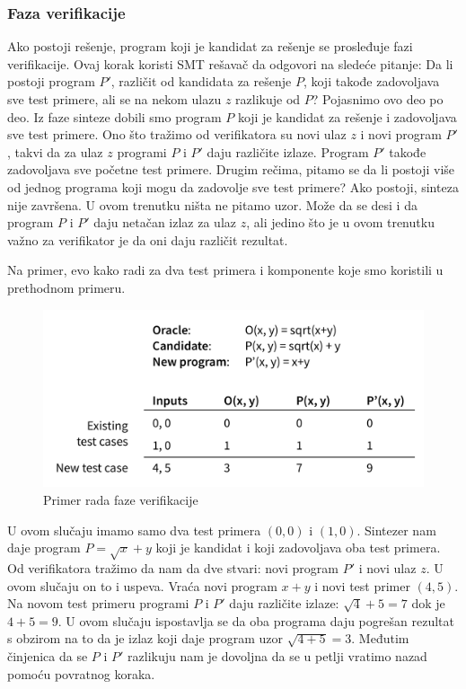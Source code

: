 \subsubsection*{Faza verifikacije}

Ako postoji rešenje, program koji je kandidat za rešenje se prosleđuje fazi verifikacije. Ovaj korak koristi SMT rešavač da odgovori na sledeće pitanje: Da li postoji program $P'$, različit od kandidata za rešenje $P$, koji takođe zadovoljava sve test primere, ali se na nekom ulazu $z$ razlikuje od $P$?
Pojasnimo ovo deo po deo. Iz faze sinteze dobili smo program $P$ koji je kandidat za rešenje i zadovoljava sve test primere. Ono što tražimo od verifikatora su novi ulaz $z$ i novi program $P'$, takvi da za ulaz $z$ programi $P$ i $P'$ daju različite izlaze. Program $P'$ takođe zadovoljava sve početne test primere.
Drugim rečima, pitamo se da li postoji više od jednog programa koji mogu da zadovolje sve test primere? Ako postoji, sinteza nije završena.
U ovom trenutku ništa ne pitamo uzor. Može da se desi i da program $P$ i $P'$ daju netačan izlaz za ulaz $z$, ali jedino što je u ovom trenutku važno za verifikator je da oni daju različit rezultat.

Na primer, evo kako radi za dva test primera i komponente koje smo koristili u prethodnom primeru.

\begin{figure}[h!]
    \begin{center}
        \includegraphics[scale=0.6]{resources/oracle-table.png}
    \end{center}
    \caption{Primer rada faze verifikacije}
    \label{fig:oraclePrimer1}
\end{figure}

U ovom slučaju imamo samo dva test primera $(0,0)$ i $(1,0)$. Sintezer nam daje program $P=\sqrt{x}+y$ koji je kandidat i koji zadovoljava oba test primera. Od verifikatora tražimo da nam da dve stvari: novi program $P'$ i novi ulaz $z$. U ovom slučaju on to i uspeva. Vraća novi program $x+y$ i novi test primer $(4,5)$. Na novom test primeru programi $P$ i $P'$ daju različite izlaze: $\sqrt{4}+5=7$ dok je $4+5=9$. U ovom slučaju ispostavlja se da oba programa daju pogrešan rezultat s obzirom na to da je izlaz koji daje program uzor $\sqrt{4+5}=3$. Međutim činjenica da se $P$ i $P'$ razlikuju nam je dovoljna da se u petlji vratimo nazad pomoću povratnog koraka.


